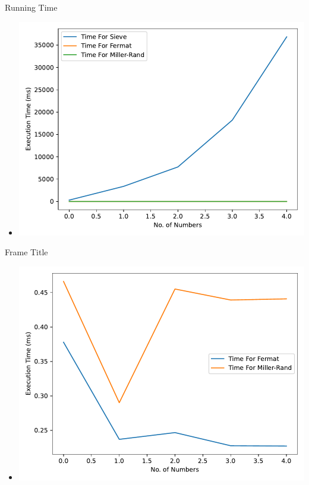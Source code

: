 \documentclass{beamer}
\begin{document}
\begin{frame}{Running Time}
    \begin{itemize}
        \item \includegraphics[width=\textwidth]{Fermat-Sieve-MillerRand.pdf}
    \end{itemize}
\end{frame}
\begin{frame}{Frame Title}
    \begin{itemize}
        \item \includegraphics[width=\textwidth]{Fermat-MillerRand.pdf}
    \end{itemize}
\end{frame}
\end{document}
